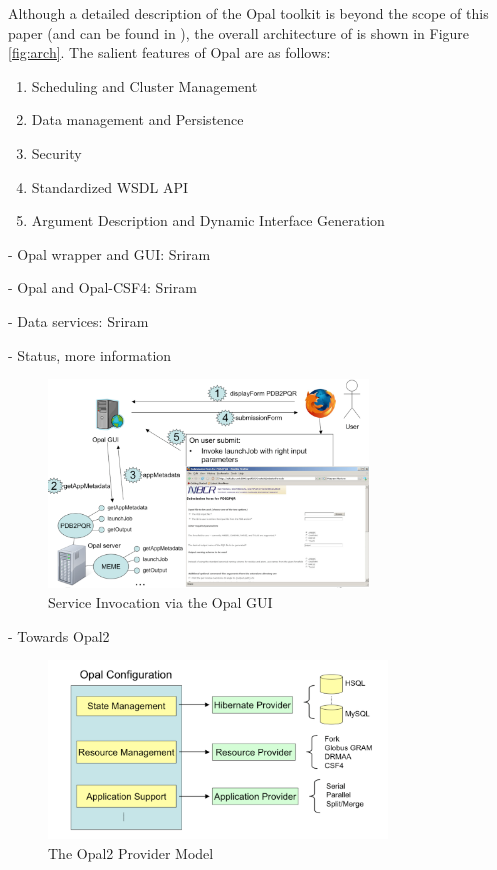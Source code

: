 \documentclass[conference]{IEEEtran}
\begin{document}
Although a detailed description of the Opal toolkit is beyond the scope of
this paper (and can be found in \cite{opal}), the overall architecture of
is shown in Figure \ref{fig:arch}. The salient features of Opal are as
follows:

\begin{enumerate}
\item{Scheduling and Cluster Management}
\item{Data management and Persistence}
\item{Security}
\item{Standardized WSDL API}
\item{Argument Description and Dynamic Interface Generation}
\end{enumerate}

- Opal wrapper and GUI: Sriram 

- Opal and Opal-CSF4: Sriram

- Data services: Sriram

- Status, more information

\begin{figure}
\begin{center}
\includegraphics[width=8.5cm]{opal-gui}
\end{center}
\caption{Service Invocation via the Opal GUI}
\label{fig:opal-gui}
\end{figure}

- Towards Opal2

\begin{figure}
\begin{center}
\includegraphics[width=9cm]{opal2-providers}
\end{center}
\caption{The Opal2 Provider Model}
\label{fig:opal2-providers}
\end{figure}
\end{document}
